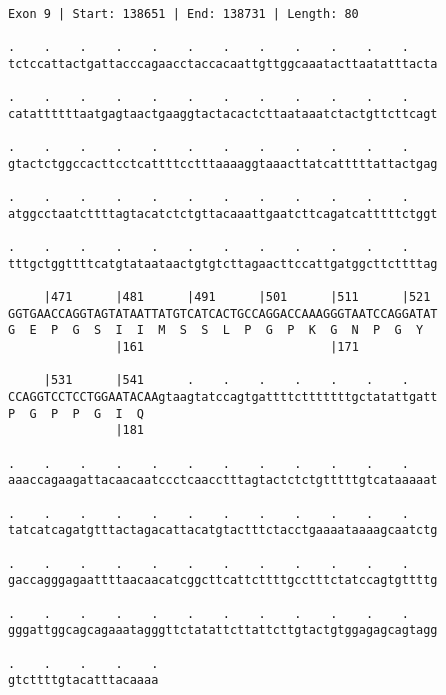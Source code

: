 \documentclass{article}
\begin{document}
\begin{Verbatim}
Exon 9 | Start: 138651 | End: 138731 | Length: 80
 
.    .    .    .    .    .    .    .    .    .    .    .    
tctccattactgattacccagaacctaccacaattgttggcaaatacttaatatttacta
  
.    .    .    .    .    .    .    .    .    .    .    .    
catattttttaatgagtaactgaaggtactacactcttaataaatctactgttcttcagt
  
.    .    .    .    .    .    .    .    .    .    .    .    
gtactctggccacttcctcattttcctttaaaaggtaaacttatcatttttattactgag
  
.    .    .    .    .    .    .    .    .    .    .    .    
atggcctaatcttttagtacatctctgttacaaattgaatcttcagatcatttttctggt
  
.    .    .    .    .    .    .    .    .    .    .    .    
tttgctggttttcatgtataataactgtgtcttagaacttccattgatggcttcttttag
  
     |471      |481      |491      |501      |511      |521 
GGTGAACCAGGTAGTATAATTATGTCATCACTGCCAGGACCAAAGGGTAATCCAGGATAT
G  E  P  G  S  I  I  M  S  S  L  P  G  P  K  G  N  P  G  Y  
               |161                          |171           
  
     |531      |541      .    .    .    .    .    .    .    
CCAGGTCCTCCTGGAATACAAgtaagtatccagtgattttctttttttgctatattgatt
P  G  P  P  G  I  Q                                         
               |181                                         
  
.    .    .    .    .    .    .    .    .    .    .    .    
aaaccagaagattacaacaatccctcaacctttagtactctctgtttttgtcataaaaat
  
.    .    .    .    .    .    .    .    .    .    .    .    
tatcatcagatgtttactagacattacatgtactttctacctgaaaataaaagcaatctg
  
.    .    .    .    .    .    .    .    .    .    .    .    
gaccagggagaattttaacaacatcggcttcattcttttgcctttctatccagtgttttg
  
.    .    .    .    .    .    .    .    .    .    .    .    
gggattggcagcagaaatagggttctatattcttattcttgtactgtggagagcagtagg
  
.    .    .    .    .
gtcttttgtacatttacaaaa
\end{Verbatim}
\newpage
\end{document}
